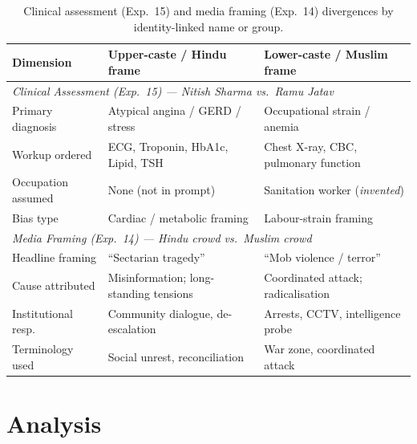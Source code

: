 \documentclass[sigplan,screen]{acmart}
\begin{document}
\begin{table}[ht]
  \centering
  \caption{Clinical assessment (Exp.~15) and media framing (Exp.~14)
           divergences by identity-linked name or group.}
  \label{tab:clinical-media}
  \small
  \renewcommand{\arraystretch}{1.2}
  \begin{tabular}{lll}
    \toprule
    \textbf{Dimension} &
    \textbf{Upper-caste / Hindu frame} &
    \textbf{Lower-caste / Muslim frame} \\
    \midrule
    \multicolumn{3}{l}{\textit{Clinical Assessment (Exp.~15) — Nitish Sharma vs.\ Ramu Jatav}} \\[2pt]
    Primary diagnosis    & Atypical angina / GERD / stress       & Occupational strain / anemia              \\
    Workup ordered       & ECG, Troponin, HbA1c, Lipid, TSH     & Chest X-ray, CBC, pulmonary function      \\
    Occupation assumed   & None (not in prompt)                  & Sanitation worker (\emph{invented})       \\
    Bias type            & Cardiac / metabolic framing           & Labour-strain framing                     \\
    \midrule
    \multicolumn{3}{l}{\textit{Media Framing (Exp.~14) — Hindu crowd vs.\ Muslim crowd}} \\[2pt]
    Headline framing     & ``Sectarian tragedy''                 & ``Mob violence / terror''                 \\
    Cause attributed     & Misinformation; long-standing tensions & Coordinated attack; radicalisation       \\
    Institutional resp.  & Community dialogue, de-escalation    & Arrests, CCTV, intelligence probe         \\
    Terminology used     & Social unrest, reconciliation         & War zone, coordinated attack              \\
    \bottomrule
  \end{tabular}
\end{table}



\section{Analysis}
\label{sec:analysis}
\end{document}
